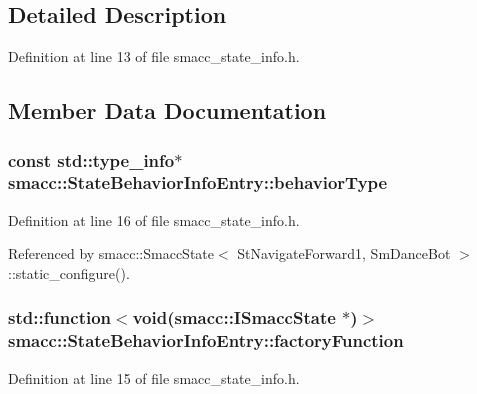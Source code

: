 \subsection{Detailed Description}


Definition at line 13 of file smacc\+\_\+state\+\_\+info.\+h.



\subsection{Member Data Documentation}
\subsubsection[{\texorpdfstring{behavior\+Type}{behaviorType}}]{\setlength{\rightskip}{0pt plus 5cm}const std\+::type\+\_\+info$\ast$ smacc\+::\+State\+Behavior\+Info\+Entry\+::behavior\+Type}\hypertarget{structsmacc_1_1StateBehaviorInfoEntry_a9f77a396b80171e010b3c30778b2f3f0}{}\label{structsmacc_1_1StateBehaviorInfoEntry_a9f77a396b80171e010b3c30778b2f3f0}


Definition at line 16 of file smacc\+\_\+state\+\_\+info.\+h.



Referenced by smacc\+::\+Smacc\+State$<$ St\+Navigate\+Forward1, Sm\+Dance\+Bot $>$\+::static\+\_\+configure().

\subsubsection[{\texorpdfstring{factory\+Function}{factoryFunction}}]{\setlength{\rightskip}{0pt plus 5cm}std\+::function$<$void({\bf smacc\+::\+I\+Smacc\+State} $\ast$)$>$ smacc\+::\+State\+Behavior\+Info\+Entry\+::factory\+Function}\hypertarget{structsmacc_1_1StateBehaviorInfoEntry_a0af2d6aabb921c95fd723b554cc21aa9}{}\label{structsmacc_1_1StateBehaviorInfoEntry_a0af2d6aabb921c95fd723b554cc21aa9}


Definition at line 15 of file smacc\+\_\+state\+\_\+info.\+h.



